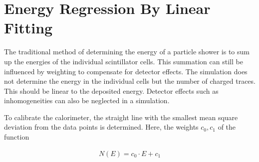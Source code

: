 \documentclass[12pt, a4paper]{thesis}
\begin{document}
\begin{figure}[H]%
  \centering
  \qquad
  \caption{}%
  \label{fig:y-distri}%
\end{figure}


\section{Energy Regression By Linear Fitting}
\label{sec:orgd10286d}

The traditional method of determining the energy of a particle shower
is to sum up the energies of the individual scintillator
cells. This summation can still be influenced by weighting to
compensate for detector effects. The simulation does not determine the
energy in the individual cells but the number of charged traces. This
should be linear to the deposited energy. Detector effects such as
inhomogeneities can also be neglected in a simulation.

To calibrate the calorimeter, the straight line with the smallest mean
square deviation from the data points is determined. Here, the weights
\(c_0, c_1\) of the function

\begin{align}
  N(E) = c_0 \cdot E + c_1
\end{align}
\end{document}
